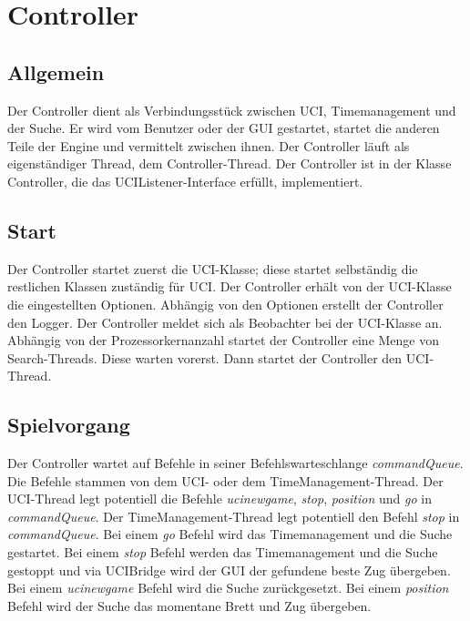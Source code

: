 \section{Controller}\label{sec:controller}
\subsection{Allgemein}\label{subsec:allgemeincontroller}
Der Controller dient als Verbindungsst\"uck zwischen UCI, Timemanagement und der Suche.
Er wird vom Benutzer oder der GUI gestartet, startet die anderen Teile der Engine und vermittelt zwischen ihnen.
Der Controller l\"auft als eigenst\"andiger Thread, dem Controller-Thread.
Der Controller ist in der Klasse Controller, die das UCIListener-Interface erf\"ullt, implementiert.
\subsection{Start}\label{subsec:start}
Der Controller startet zuerst die UCI-Klasse;
diese startet selbst\"andig die restlichen Klassen zust\"andig f\"ur UCI\@.
Der Controller erh\"alt von der UCI-Klasse die eingestellten Optionen.
Abh\"angig von den Optionen erstellt der Controller den Logger.
Der Controller meldet sich als Beobachter bei der UCI-Klasse an.
Abh\"angig von der Prozessorkernanzahl startet der Controller eine Menge von Search-Threads.
Diese warten vorerst.
Dann startet der Controller den UCI-Thread.
\subsection{Spielvorgang}\label{subsec:controllerspielvorgang}
Der Controller wartet auf Befehle in seiner Befehlswarteschlange \textit{commandQueue}.
Die Befehle stammen von dem UCI- oder dem TimeManagement-Thread.
Der UCI-Thread legt potentiell die Befehle \textit{ucinewgame}, \textit{stop}, \textit{position} und \textit{go} in
\textit{commandQueue}.
Der TimeManagement-Thread legt potentiell den Befehl \textit{stop} in \textit{commandQueue}.
\newline
Bei einem \textit{go} Befehl wird das Timemanagement und die Suche gestartet.
\newline Bei einem \textit{stop} Befehl werden das Timemanagement und die Suche gestoppt und via UCIBridge wird der GUI
der gefundene beste Zug \"ubergeben.
\newline Bei einem \textit{ucinewgame} Befehl wird die Suche zur\"uckgesetzt.
\newline Bei einem \textit{position} Befehl wird der Suche das momentane Brett und Zug \"ubergeben.